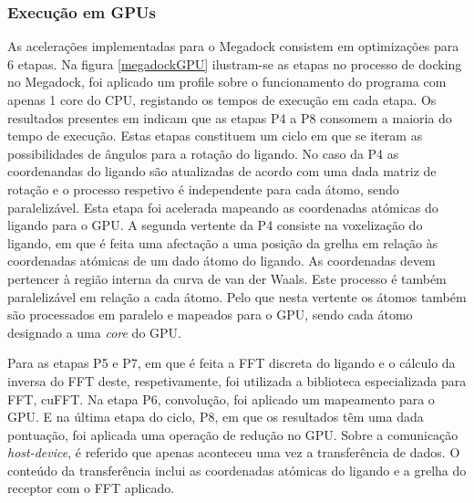  \subsubsection{Execução em GPUs}
As acelerações implementadas para o Megadock consistem em optimizações para 6 etapas. Na figura \ref{megadockGPU} ilustram-se as etapas no processo de docking no Megadock, foi aplicado um profile sobre o funcionamento do programa com apenas 1 core do CPU, registando os tempos de execução em cada etapa. Os resultados presentes em \cite{shimoda2015protein} indicam que as etapas P4 a P8 consomem a maioria do tempo de execução. Estas etapas constituem um ciclo em que se iteram as possibilidades de ângulos para a rotação do ligando. No caso da P4 as coordenandas do ligando são atualizadas de acordo com uma dada matriz de rotação e o processo respetivo é independente para cada átomo, sendo paralelizável. Esta etapa foi acelerada mapeando as coordenadas atómicas do ligando para o GPU. 
A segunda vertente da P4 consiste na voxelização do ligando, em que é feita uma afectação a uma posição da grelha em relação às coordenadas atómicas de um dado átomo do ligando. As coordenadas devem pertencer à região interna da curva de van der Waals. Este processo é também paralelizável em relação a cada átomo. Pelo que nesta vertente os átomos também são processados em paralelo e mapeados para o GPU, sendo cada átomo designado a uma \textit{core} do GPU.\par Para as etapas P5 e P7, em que é feita a FFT discreta do ligando e o cálculo da inversa do FFT deste, respetivamente, foi utilizada a biblioteca especializada para FFT, cuFFT. Na etapa P6, convolução, foi aplicado um mapeamento para o GPU. E na última etapa do ciclo, P8, em que os resultados têm uma dada pontuação, foi aplicada uma operação de redução no GPU. 
Sobre a comunicação \textit{host-device}, é referido que apenas aconteceu uma vez a transferência de dados. O conteúdo da transferência inclui as coordenadas atómicas do ligando e a grelha do receptor com o FFT aplicado. \par
